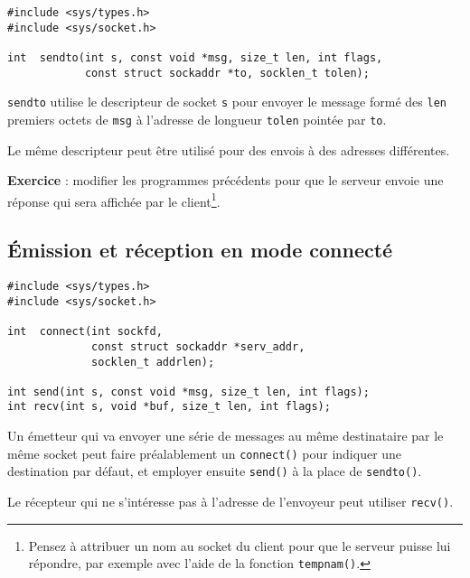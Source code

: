 
\extrait
\begin{lstlisting}
#include <sys/types.h>
#include <sys/socket.h>

int  sendto(int s, const void *msg, size_t len, int flags,
            const struct sockaddr *to, socklen_t tolen);
\end{lstlisting}


\texttt{sendto} utilise le descripteur de socket \texttt{s} pour
envoyer le message formé des \texttt{len} premiers octets de
\texttt{msg} à l'adresse de longueur \texttt{tolen} pointée par
\texttt{to}.


Le même descripteur peut être utilisé pour des envois à des
adresses différentes.


\source



\textbf{Exercice} : modifier les programmes précédents pour que le
serveur envoie une réponse qui sera affichée par le client\footnote{
Pensez à attribuer un nom au socket du client pour que le serveur puisse lui
répondre, par exemple avec l'aide de
la fonction \texttt{tempnam()}.}. 


\subsection{Émission et réception en mode connecté}


\extrait
\begin{lstlisting}
#include <sys/types.h>
#include <sys/socket.h>

int  connect(int sockfd, 
             const struct sockaddr *serv_addr,
             socklen_t addrlen);

int send(int s, const void *msg, size_t len, int flags);
int recv(int s, void *buf, size_t len, int flags);
\end{lstlisting}


Un émetteur qui va envoyer une série de messages au même destinataire
par le même socket peut faire préalablement un \texttt{connect()} pour
indiquer une destination par défaut, et employer ensuite
\texttt{send()} à la place de \texttt{sendto()}.


Le récepteur qui ne s'intéresse pas à l'adresse de l'envoyeur peut
utiliser \texttt{recv()}.  


